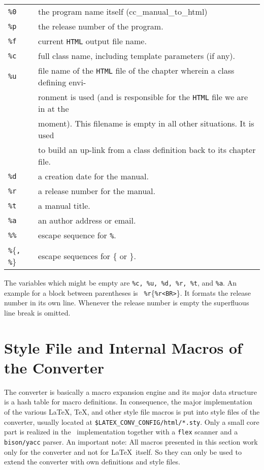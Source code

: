 \documentclass[12pt]{article}
\makeatletter
\newcommand{\TTindex}[1]{\index{#1@{\tt #1}}}
\makeatother
\begin{document}
\begin{tabular}{ll}
    {\tt\%0}  &  the program name itself (cc\_manual\_to\_html) \\
    {\tt\%p}  &  the release number of the program. \\
    {\tt\%f}  &  current {\tt HTML} output file name. \\
    {\tt\%c}  &  full class name, including template parameters (if any). \\
    {\tt\%u}  &  file name of the {\tt HTML} file of the chapter wherein a
    class defining envi- \\ & ronment is used (and is responsible for the
    {\tt HTML} file we are in at the\\ &  moment). This filename is empty
    in all other situations. It is used \\ & to build an up-link from a
    class definition back to its chapter file. \\
    {\tt\%d}  &  a creation date for the manual.\\
    {\tt\%r}  &  a release number for the manual.\\
    {\tt\%t}  &  a manual title. \\
    {\tt\%a}  &  an author address or email.\\
    {\tt\%\%}  &  escape sequence for {\tt\%}.\\
    {\tt\%}\{{\tt , \%}\}  &  escape sequences for \{ or \}.
\end{tabular}

The variables which might be empty are {\tt\%c, \%u, \%d, \%r, \%t},
and {\tt\%a}.  An example for a block between parentheses is {\tt
  \%r}\{{\tt \%r<BR>}\}. It formats the release number in its own line.
Whenever the release number is empty the superfluous line break
is omitted.

\section{Style File and Internal Macros of the Converter}

The converter is basically a macro expansion engine and its major data
structure is a hash table for macro definitions. In consequence, the
major implementation of the various \LaTeX, \TeX, and other style file
macros is put into style files of the converter, usually located at
{\tt \$\Open LATEX\_CONV\_CONFIG\Close/html/*.sty}. Only a small core
part is realized in the \CC\ implementation together with a {\tt flex}
scanner and a {\tt bison/yacc} parser. An important note: All macros
presented in this section work only for the converter and not for
\LaTeX\ itself. So they can only be used to extend the converter with own
definitions and style files.
\TTindex{flex}\TTindex{bison}\TTindex{yacc}
\end{document}
